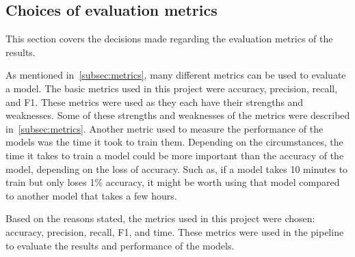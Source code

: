 \subsection{Choices of evaluation metrics}\label{subsec:choice-of-evaluation}
This section covers the decisions made regarding the evaluation metrics of the results.

As mentioned in~\autoref{subsec:metrics}, many different metrics can be used to evaluate a model. The basic metrics used in this project were accuracy, precision, recall, and F1. These metrics were used as they each have their strengths and weaknesses. Some of these strengths and weaknesses of the metrics were described in~\autoref{subsec:metrics}.
Another metric used to measure the performance of the models was the time it took to train them. Depending on the circumstances, the time it takes to train a model could be more important than the accuracy of the model, depending on the loss of accuracy. Such as, if a model takes 10 minutes to train but only loses 1\% accuracy, it might be worth using that model compared to another model that takes a few hours.

Based on the reasons stated, the metrics used in this project were chosen: accuracy, precision, recall, F1, and time. These metrics were used in the pipeline to evaluate the results and performance of the models.